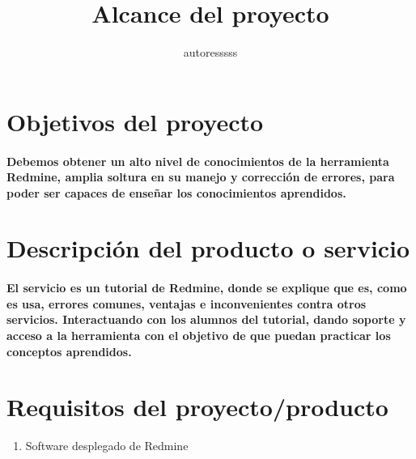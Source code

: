 \documentclass[a4paper,10pt]{article}
\title{Alcance del proyecto}
\author{autoresssss}
\begin{document}
\maketitle



\section*{Objetivos del proyecto}

\paragraph{Debemos obtener un alto nivel de conocimientos de la herramienta Redmine, amplia soltura en su manejo y corrección de errores, para poder ser capaces de enseñar los conocimientos aprendidos.}

\section*{Descripción del producto o servicio}

\paragraph{El servicio es un tutorial de Redmine, donde se explique que es, como es usa, errores comunes, ventajas e inconvenientes contra otros servicios. Interactuando con los alumnos del tutorial, dando soporte y acceso a la herramienta con el objetivo de que puedan practicar los conceptos aprendidos.}

\section*{Requisitos del proyecto/producto}



\begin{enumerate}
	\item Software desplegado de Redmine
\end{enumerate}














\end{document}
